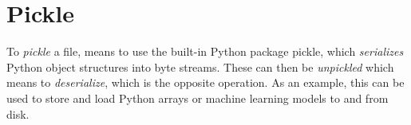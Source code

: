         
    \section{Pickle}
        To \textit{pickle}\cite{pickle} a file, means to use the built-in Python package pickle, which \textit{serializes} Python object structures into byte streams. These can then be \textit{unpickled} which means to \textit{deserialize}, which is the opposite operation. As an example, this can be used to store and load Python arrays or machine learning models to and from disk.
        
        
    
